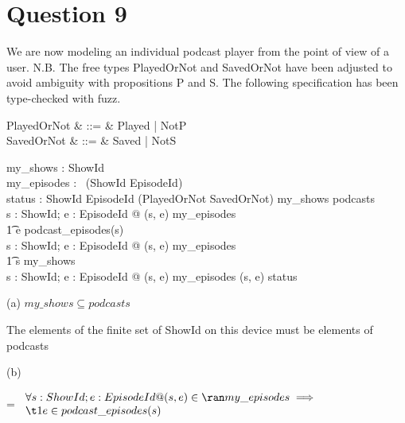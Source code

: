 \documentclass[a4paper,10pt,fleqn]{article}
\begin{document}
\bigskip

\setlength{\leftskip}{0pt}
\section*{Question 9}

\noindent We are now modeling an individual podcast player from the point of view of a user.  N.B. The free types PlayedOrNot and SavedOrNot have been adjusted to avoid ambiguity with propositions P and S. The following specification has been type-checked with fuzz. 

\bigskip

\begin{syntax}
PlayedOrNot & ::= & Played | NotP \\
SavedOrNot & ::= & Saved | NotS
\end{syntax}

\begin{axdef}
my\_shows : \finset ShowId \\
my\_episodes : \iseq~(ShowId \cross EpisodeId) \\
status : ShowId \cross EpisodeId \pfun (PlayedOrNot \cross SavedOrNot)
\where
my\_shows \subseteq podcasts \\
\forall s : ShowId; e : EpisodeId @ (s, e) \in \ran my\_episodes \implies \\
\t1 e \in podcast\_episodes(s) \\
\forall s : ShowId; e : EpisodeId @ (s, e) \in \ran my\_episodes \implies \\
\t1 s \in my\_shows \\
\forall s : ShowId; e : EpisodeId @ (s, e) \in \ran my\_episodes \iff (s, e) \in \dom status
\end{axdef}

\noindent\hspace*{\parindent}(a) $my\_shows \subseteq podcasts$

\bigskip

\setlength{\leftskip}{\dimexpr\parindent+2em\relax}
\noindent The elements of the finite set of ShowId on this device must be elements of podcasts

\bigskip

\setlength{\leftskip}{0pt}
\medskip

\noindent\hspace*{\parindent}(b)

\setlength{\leftskip}{\dimexpr\parindent+2em\relax}
\savedleftskip=\leftskip
\noindent
$\displaystyle
\begin{array}{l}
\forall s : ShowId; e : EpisodeId @ (s, e) \in \ran my\_episodes \implies \\
\t1 e \in podcast\_episodes(s)
\end{array}$
\end{document}
